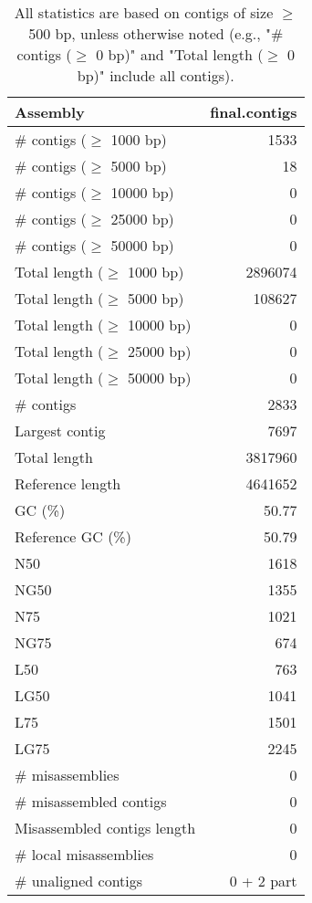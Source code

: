 \documentclass[12pt,a4paper]{article}
\begin{document}
\begin{table}[ht]
\begin{center}
\caption{All statistics are based on contigs of size $\geq$ 500 bp, unless otherwise noted (e.g., "\# contigs ($\geq$ 0 bp)" and "Total length ($\geq$ 0 bp)" include all contigs).}
\begin{tabular}{|l*{1}{|r}|}
\hline
Assembly & final.contigs \\ \hline
\# contigs ($\geq$ 1000 bp) & 1533 \\ \hline
\# contigs ($\geq$ 5000 bp) & 18 \\ \hline
\# contigs ($\geq$ 10000 bp) & 0 \\ \hline
\# contigs ($\geq$ 25000 bp) & 0 \\ \hline
\# contigs ($\geq$ 50000 bp) & 0 \\ \hline
Total length ($\geq$ 1000 bp) & 2896074 \\ \hline
Total length ($\geq$ 5000 bp) & 108627 \\ \hline
Total length ($\geq$ 10000 bp) & 0 \\ \hline
Total length ($\geq$ 25000 bp) & 0 \\ \hline
Total length ($\geq$ 50000 bp) & 0 \\ \hline
\# contigs & 2833 \\ \hline
Largest contig & 7697 \\ \hline
Total length & 3817960 \\ \hline
Reference length & 4641652 \\ \hline
GC (\%) & 50.77 \\ \hline
Reference GC (\%) & 50.79 \\ \hline
N50 & 1618 \\ \hline
NG50 & 1355 \\ \hline
N75 & 1021 \\ \hline
NG75 & 674 \\ \hline
L50 & 763 \\ \hline
LG50 & 1041 \\ \hline
L75 & 1501 \\ \hline
LG75 & 2245 \\ \hline
\# misassemblies & 0 \\ \hline
\# misassembled contigs & 0 \\ \hline
Misassembled contigs length & 0 \\ \hline
\# local misassemblies & 0 \\ \hline
\# unaligned contigs & 0 + 2 part \\ \hline

\end{tabular}
\end{center}
\end{table}
\end{document}

